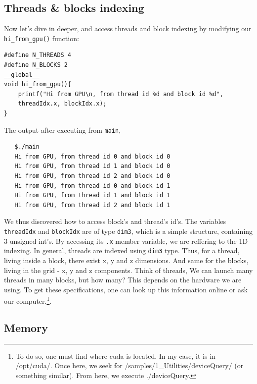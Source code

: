 \subsection{Threads \& blocks indexing}
Now let's dive in deeper, and access threads and block indexing by modifying our 
\verb|hi_from_gpu()| function:
\vspace{-0.5cm}
\begin{verbatim}
#define N_THREADS 4
#define N_BLOCKS 2
__global__ 
void hi_from_gpu(){
    printf("Hi from GPU\n, from thread id %d and block id %d", 
    threadIdx.x, blockIdx.x);
}
\end{verbatim}
The output after executing from \verb|main|,
\vspace{-0.5cm}
\begin{verbatim}
   $./main
   Hi from GPU, from thread id 0 and block id 0 
   Hi from GPU, from thread id 1 and block id 0 
   Hi from GPU, from thread id 2 and block id 0 
   Hi from GPU, from thread id 0 and block id 1 
   Hi from GPU, from thread id 1 and block id 1 
   Hi from GPU, from thread id 2 and block id 1 
\end{verbatim}
\vspace{-0.5cm}
We thus discovered how to access block's and thread's id's. The 
variables \verb|threadIdx| and \verb|blockIdx| are of type \verb|dim3|,
which is a simple structure, containing 3 unsigned int's. By accessing 
its \verb|.x| member variable, we are reffering to the 1D indexing. In general, 
threads are indexed using \verb|dim3| type. Thus, for a thread, living inside a block, there exist x, y and z 
dimensions. And same for the blocks, living in the grid - x, y and z components. 
Think of threads, 
We can launch many threads in many blocks, but how many? This depends on 
the hardware we are using.
To get these specifications, one can look up this information online or ask our computer.\footnote{
To do so, one must find where {\selectfont cuda} is located. In my case, it is in 
{\selectfont /opt/cuda/}.
Once here, we seek for {\selectfont /samples/1\_Utilities/deviceQuery/} 
(or something similar). 
From here, we execute {\selectfont ./deviceQuery}.   
}.

\subsection{Memory}

